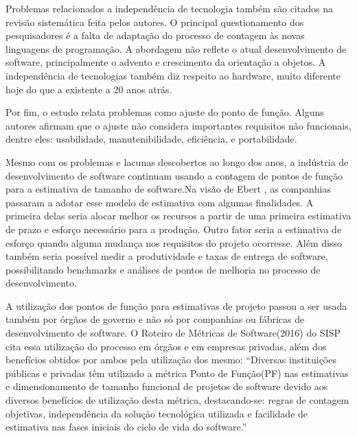 Problemas relacionados a independência de tecnologia também são citados na revisão sistemática feita pelos autores. O principal questionamento dos pesquisadores é a falta de adaptação do processo de contagem às novas linguagens de programação. A abordagem não reflete o atual desenvolvimento de software, principalmente o advento e crescimento da orientação a objetos. A independência de tecnologias também diz respeito ao hardware, muito diferente hoje do que a existente a 20 anos atrás.

Por fim, o estudo relata problemas como ajuste do ponto de função. Alguns autores afirmam que o ajuste não considera  importantes requisitos não funcionais, dentre eles: usabilidade, manutenibilidade, eficiência, e portabilidade.

Mesmo com os problemas e lacunas descobertos ao longo dos anos, a indústria de desenvolvimento de software continuam usando a contagem de pontos de função para a estimativa de tamanho de software.Na visão de Ebert \cite{Ebert:2014}, as companhias passaram a adotar esse modelo de estimativa com algumas finalidades. A primeira delas seria alocar melhor os recursos a partir de uma primeira estimativa de prazo e esforço necessário para a produção. Outro fator seria a estimativa de esforço quando alguma mudança nos requisitos do projeto ocorresse. Além disso também seria possível medir a produtividade e taxas de entrega de software, possibilitando benchmarks  e análises de pontos de melhoria no processo de desenvolvimento.

A utilização dos pontos de função para estimativas de projeto passou a ser usada também por órgãos de governo e não só por companhias ou fábricas de desenvolvimento de software. O Roteiro de Métricas de Software(2016) do SISP cita essa utilização do processo em órgãos e em empresas privadas, além dos benefícios obtidos por ambos pela utilização dos mesmo:  “Diversas instituições públicas e privadas têm utilizado a métrica Ponto de Função(PF) nas estimativas e dimensionamento de tamanho funcional de projetos de software devido aos diversos benefícios de utilização desta métrica, destacando-se: regras de contagem objetivas, independência da solução tecnológica utilizada e facilidade de estimativa nas fases iniciais do ciclo de vida do software.”
